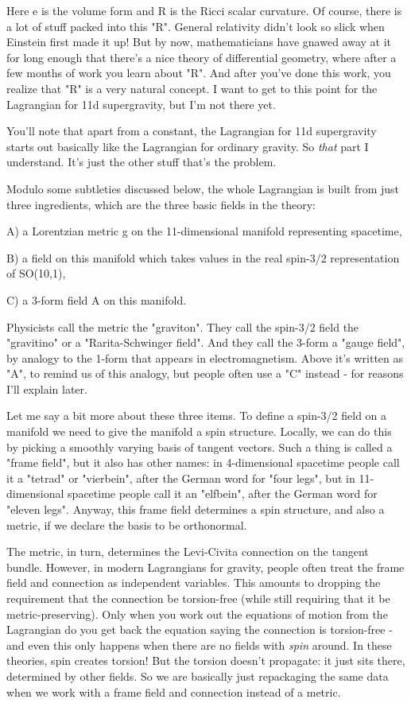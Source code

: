 Here e is the volume form and R is the Ricci scalar curvature.  Of
course, there is a lot of stuff packed into this "R".  General relativity 
didn't look so slick when Einstein first made it up!  But by now,
mathematicians have gnawed away at it for long enough that there's a
nice theory of differential geometry, where after a few months of work
you learn about "R".  And after you've done this work, you realize that
"R" is a very natural concept.  I want to get to this point for the
Lagrangian for 11d supergravity, but I'm not there yet.
 
You'll note that apart from a constant, the Lagrangian for 11d 
supergravity starts out basically like the Lagrangian for ordinary 
gravity.  So \emph{that} part I understand.  It's just the other stuff  
that's the problem. 
 
Modulo some subtleties discussed below, the whole Lagrangian is built 
from just three ingredients, which are the three basic fields in the 
theory: 
 
A) a Lorentzian metric g on the 11-dimensional manifold 
representing spacetime, 
 
B) a field \psi  on this manifold which takes values in the real  
spin-3/2 representation of SO(10,1), 
 
C) a 3-form field A on this manifold. 
 
Physicists call the metric the "graviton".  They call the spin-3/2 field 
the "gravitino" or a "Rarita-Schwinger field".  And they call the 3-form  
a "gauge field", by analogy to the 1-form that appears in electromagnetism. 
Above it's written as "A", to remind us of this analogy, but people often  
use a "C" instead - for reasons I'll explain later. 
 
Let me say a bit more about these three items.  To define a spin-3/2
field on a manifold we need to give the manifold a spin structure.
Locally, we can do this by picking a smoothly varying basis of tangent
vectors.  Such a thing is called a "frame field", but it also has other
names: in 4-dimensional spacetime people call it a "tetrad" or
"vierbein", after the German word for "four legs", but in 11-dimensional
spacetime people call it an "elfbein", after the German word for "eleven
legs".  Anyway, this frame field determines a spin structure, and also
a metric, if we declare the basis to be orthonormal.
 
The metric, in turn, determines the Levi-Civita connection on the 
tangent bundle.  However, in modern Lagrangians for gravity, people 
often treat the frame field and connection as independent variables.   
This amounts to dropping the requirement that the connection be 
torsion-free (while still requiring that it be metric-preserving).  Only 
when you work out the equations of motion from the Lagrangian do you get 
back the equation saying the connection is torsion-free - and even this 
only happens when there are no fields with \emph{spin} around.   In these 
theories, spin creates torsion!  But the torsion doesn't propagate:  it 
just sits there, determined by other fields.  So we are basically just 
repackaging the same data when we work with a frame field and connection 
instead of a metric.   
 
